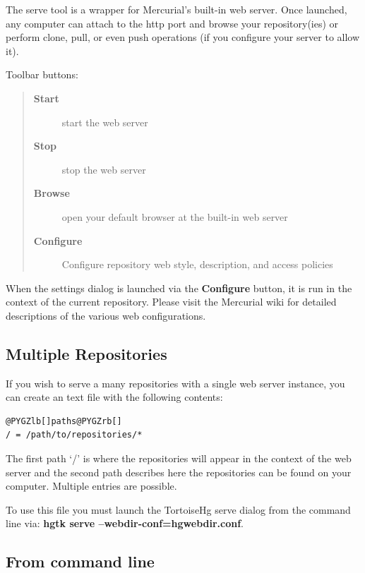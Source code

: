 \documentclass[letterpaper,10pt,english]{manual}
\begin{document}
The serve tool is a wrapper for Mercurial's built-in web server. Once
launched, any computer can attach to the http port and browse your
repository(ies) or perform clone, pull, or even push operations (if you
configure your server to allow it).

Toolbar buttons:
\begin{quote}
\begin{description}
\item[\textbf{Start}]
start the web server

\item[\textbf{Stop}]
stop the web server

\item[\textbf{Browse}]
open your default browser at the built-in web server

\item[\textbf{Configure}]
Configure repository web style, description, and access policies

\end{description}
\end{quote}

When the settings dialog is launched via the \textbf{Configure}
button, it is run in the context of the current repository.  Please
visit the Mercurial wiki for detailed descriptions of the various
web configurations.


\subsection{Multiple Repositories}

If you wish to serve a many repositories with a single web server
instance, you can create an  text file with the
following contents:

\begin{Verbatim}[commandchars=@\[\]]
@PYGZlb[]paths@PYGZrb[]
/ = /path/to/repositories/*
\end{Verbatim}

The first path `/' is where the repositories will appear in the context
of the web server and the second path describes here the repositories
can be found on your computer.  Multiple entries are possible.

To use this file you must launch the TortoiseHg serve dialog from the
command line via: \textbf{hgtk serve --webdir-conf=hgwebdir.conf}.


\subsection{From command line}
\end{document}
